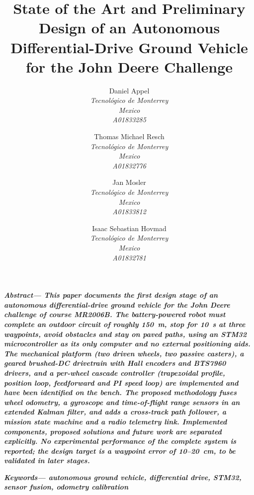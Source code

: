 \documentclass[conference]{IEEEtran}\newcommand{\haveieee}{}%
\renewenvironment{abstract}{\noindent\small\bfseries\itshape Abstract\upshape---}{\par\vspace{0.6ex}\normalfont}
\newenvironment{IEEEkeywords}{\noindent\small\bfseries\itshape Keywords\upshape---\itshape}{\par\vspace{0.6ex}\normalfont}
\newcommand{\IEEEauthorblockN}[1]{\normalsize #1\\[0.3ex]}
\newcommand{\IEEEauthorblockA}[1]{\small\itshape #1}
\begin{document}
\title{State of the Art and Preliminary Design of an Autonomous Differential-Drive Ground Vehicle for the John Deere Challenge}

\author{%
\IEEEauthorblockN{Daniel Appel}
\IEEEauthorblockA{Tecnol\'ogico de Monterrey\\Mexico\\{A01833285}}
\and
\IEEEauthorblockN{{Thomas Michael Resch}}
\IEEEauthorblockA{Tecnol\'ogico de Monterrey\\Mexico\\{A01832776}}
\and
\IEEEauthorblockN{{Jan Mosler}}
\IEEEauthorblockA{Tecnol\'ogico de Monterrey\\Mexico\\{A01833812}}
\and
\IEEEauthorblockN{{Isaac Sebastian Hovmad}}
\IEEEauthorblockA{Tecnol\'ogico de Monterrey\\Mexico\\{A01832781}}
}

\maketitle

\begin{abstract}
This paper documents the first design stage of an autonomous differential-drive ground vehicle for the John Deere challenge of course MR2006B. The battery-powered robot must complete an outdoor circuit of roughly 150~m, stop for 10~s at three waypoints, avoid obstacles and stay on paved paths, using an STM32 microcontroller as its only computer and no external positioning aids. The mechanical platform (two driven wheels, two passive casters), a geared brushed-DC drivetrain with Hall encoders and BTS7960 drivers, and a per-wheel cascade controller (trapezoidal profile, position loop, feedforward and PI speed loop) are implemented and have been identified on the bench. The proposed methodology fuses wheel odometry, a gyroscope and time-of-flight range sensors in an extended Kalman filter, and adds a cross-track path follower, a mission state machine and a radio telemetry link. Implemented components, proposed solutions and future work are separated explicitly. No experimental performance of the complete system is reported; the design target is a waypoint error of 10--20~cm, to be validated in later stages.
\end{abstract}

\begin{IEEEkeywords}
autonomous ground vehicle, differential drive, STM32, sensor fusion, odometry calibration
\end{IEEEkeywords}
\end{document}
